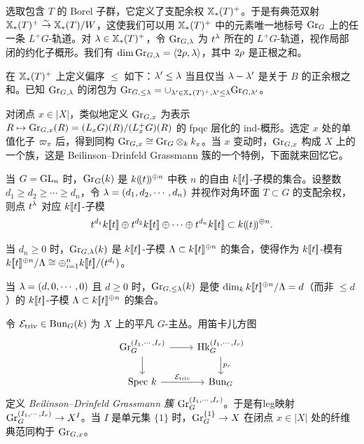 选取包含 $T$ 的 Borel 子群，它定义了支配余权 $\mathbb{X}_*(T)^{+}$。于是有典范双射 $\mathbb{X}_*(T)^{+}\stackrel{\sim}{\to} \mathbb{X}_*(T)/W$，这使我们可以用 $\mathbb{X}_*(T)^{+}$ 中的元素唯一地标号 $\textup{Gr}_{G}$ 上的任一条 $L^{+}G$-轨道。对 $\lambda\in \mathbb{X}_*(T)^{+}$，令 $\textup{Gr}_{G, \lambda}$ 为 $t^{\lambda}$ 所在的 $L^{+}G$-轨道，视作局部闭的约化子概形。我们有 $\dim\textup{Gr}_{G,\lambda}=\langle{2\rho,\lambda}\rangle$，其中 $2\rho$ 是正根之和。

在 $\mathbb{X}_*(T)^{+}$ 上定义偏序 $\le$ 如下：$\lambda'\le \lambda$ 当且仅当 $\lambda-\lambda'$ 是关于 $B$ 的正余根之和。已知 $\textup{Gr}_{G,\lambda}$ 的闭包为 $\textup{Gr}_{G,\le \lambda}=\cup_{\lambda'\in \mathbb{X}_*(T)^{+}, \lambda'\le \lambda}\textup{Gr}_{G,\lambda'}$。


对闭点 $x\in |X|$，类似地定义 $\textup{Gr}_{G,x}$ 为表示 $R\mapsto \textup{Gr}_{G,x}(R)=(L_{x}G)(R)/(L^{+}_{x}G)(R)$ 的 fpqc 层化的 ind-概形。选定 $x$ 处的单值化子 $\varpi_{x}$ 后，得到同构 $\textup{Gr}_{G,x}\cong \textup{Gr}_{G}\otimes_{k}k_{x}$。当 $x$ 变动时，$\textup{Gr}_{G,x}$ 构成 $X$ 上的一个族，这是 Beilinson–Drinfeld Grassmann 簇的一个特例，下面就来回忆它。

\begin{exam} 当 $G=\textup{GL}_{n}$ 时，$\textup{Gr}_{G}(k)$ 是 $k(\!(t)\!)^{\oplus n}$ 中秩 $n$ 的自由 $k[\![t]\!]$-子模的集合。设整数 $d_{1}\ge d_{2}\ge\cdots \ge d_{n}$，令 $\lambda=(d_{1},d_{2},\cdots, d_{n})$ 并视作对角环面 $T\subset G$ 的支配余权，则点 $t^{\lambda}$ 对应 $k[\![t]\!]$-子模
\begin{equation*}
t^{d_{1}}k\tl{t}\op t^{d_{2}}k\tl{t}\op\cdots\op t^{d_{n}}k\tl{t}\subset k\lr{t}^{\op n}.
\end{equation*}

当 $d_{n}\ge0$ 时，$\textup{Gr}_{G,\lambda}(k)$ 是 $k[\![t]\!]$-子模 $\Lambda\subset k[\![t]\!]^{\oplus n}$ 的集合，使得作为 $k[\![t]\!]$-模有 $k[\![t]\!]^{\oplus n}/\Lambda\cong \oplus_{i=1}^{n}k[\![t]\!]/(t^{d_{i}})$。

当 $\lambda=(d,0,\cdots, 0)$ 且 $d\ge0$ 时，$\textup{Gr}_{G,\le\lambda}(k)$ 是使 $\dim_{k}k[\![t]\!]^{\oplus n}/\Lambda=d$（而非 $\le d$）的 $k[\![t]\!]$-子模 $\Lambda\subset k[\![t]\!]^{\oplus n}$ 的集合。
\end{exam}



\label{sss:BD}
令 $\mathcal{E}_{\textup{triv}}\in \textup{Bun}_{G}(k)$ 为 $X$ 上的平凡 $G$-主丛。用笛卡儿方图
\begin{equation*}
\begin{tikzcd}
\Gr^{(I_{1},\cdots, I_{r})}_{G} \arrow[r] \arrow[d] & \Hk^{(I_{1},\cdots, I_{r})}_{G} \arrow[d, "p_{r}"] \\
\Spec k \arrow[r, "\cE_{\triv}"] & \Bun_{G}
\end{tikzcd}
\end{equation*}
定义 {\em Beilinson–Drinfeld Grassmann 簇} $\textup{Gr}^{(I_{1},\cdots, I_{r})}_{G}$。于是有leg映射 $\textup{Gr}^{(I_{1},\cdots, I_{r})}_{G}\to X^{I}$。当 $I$ 是单元集 $\{1\}$ 时，$\textup{Gr}^{\{1\}}_{G}\to X$ 在闭点 $x\in |X|$ 处的纤维典范同构于 $\textup{Gr}_{G,x}$。

